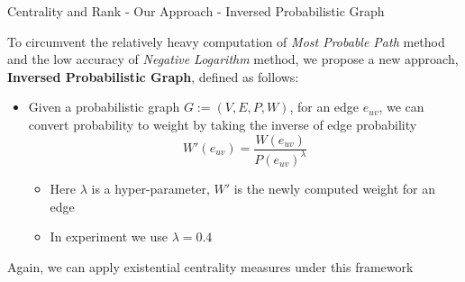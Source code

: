 \documentclass[9pt]{beamer}
\begin{document}



\begin{frame}[fragile]{Centrality and Rank - Our Approach - Inversed Probabilistic Graph}



To circumvent the relatively heavy computation of \textit{Most Probable Path} method and the low accuracy of \textit{Negative Logarithm} method, we propose a new approach, \textbf{Inversed Probabilistic Graph}, defined as follows:
\begin{itemize}
\item Given a probabilistic graph $G:=(V,E,P,W)$, for an edge $e_{uv}$, we can convert probability to weight by taking the inverse of edge probability
\[ W'(e_{uv}) = \frac{W(e_{uv})}{P(e_{uv})^\lambda }\]
\vspace{-0.15in}
\begin{itemize}
\item Here $\lambda$ is a hyper-parameter, $W'$ is the newly computed weight for an edge
\item In experiment we use $\lambda = 0.4$
\end{itemize}
\end{itemize}
Again, we can apply existential centrality measures under this framework
\end{frame}
\end{document}
